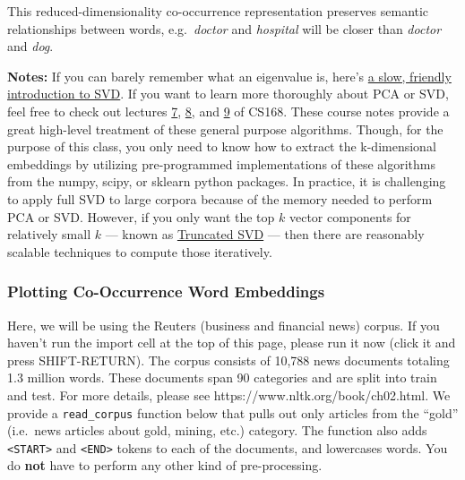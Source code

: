 \documentclass[11pt]{article}
\begin{document}
This reduced-dimensionality co-occurrence representation preserves
semantic relationships between words, e.g.~\emph{doctor} and
\emph{hospital} will be closer than \emph{doctor} and \emph{dog}.

\textbf{Notes:} If you can barely remember what an eigenvalue is, here's
\href{https://davetang.org/file/Singular_Value_Decomposition_Tutorial.pdf}{a
slow, friendly introduction to SVD}. If you want to learn more
thoroughly about PCA or SVD, feel free to check out lectures
\href{https://web.stanford.edu/class/cs168/l/l7.pdf}{7},
\href{http://theory.stanford.edu/~tim/s15/l/l8.pdf}{8}, and
\href{https://web.stanford.edu/class/cs168/l/l9.pdf}{9} of CS168. These
course notes provide a great high-level treatment of these general
purpose algorithms. Though, for the purpose of this class, you only need
to know how to extract the k-dimensional embeddings by utilizing
pre-programmed implementations of these algorithms from the numpy,
scipy, or sklearn python packages. In practice, it is challenging to
apply full SVD to large corpora because of the memory needed to perform
PCA or SVD. However, if you only want the top \(k\) vector components
for relatively small \(k\) --- known as
\href{https://en.wikipedia.org/wiki/Singular_value_decomposition\#Truncated_SVD}{Truncated
SVD} --- then there are reasonably scalable techniques to compute those
iteratively.

    \subsubsection{Plotting Co-Occurrence Word
Embeddings}\label{plotting-co-occurrence-word-embeddings}

Here, we will be using the Reuters (business and financial news) corpus.
If you haven't run the import cell at the top of this page, please run
it now (click it and press SHIFT-RETURN). The corpus consists of 10,788
news documents totaling 1.3 million words. These documents span 90
categories and are split into train and test. For more details, please
see https://www.nltk.org/book/ch02.html. We provide a
\texttt{read\_corpus} function below that pulls out only articles from
the ``gold'' (i.e.~news articles about gold, mining, etc.) category. The
function also adds \texttt{\textless{}START\textgreater{}} and
\texttt{\textless{}END\textgreater{}} tokens to each of the documents,
and lowercases words. You do \textbf{not} have to perform any other kind
of pre-processing.
\end{document}
